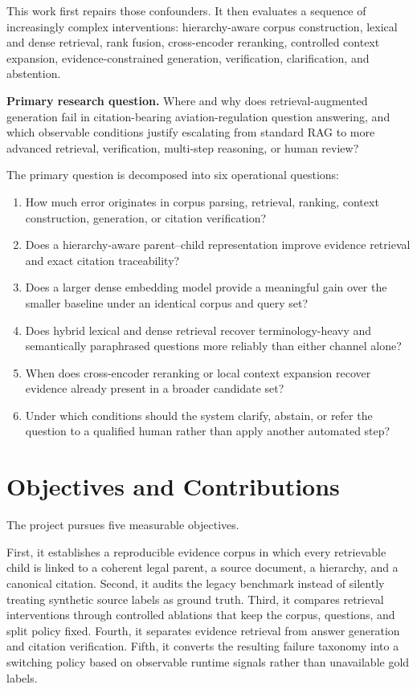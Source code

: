 This work first repairs those confounders. It then evaluates a sequence of increasingly complex interventions: hierarchy-aware corpus construction, lexical and dense retrieval, rank fusion, cross-encoder reranking, controlled context expansion, evidence-constrained generation, verification, clarification, and abstention.

\begin{infobox}
\textbf{Primary research question.}
Where and why does retrieval-augmented generation fail in citation-bearing aviation-regulation question answering, and which observable conditions justify escalating from standard RAG to more advanced retrieval, verification, multi-step reasoning, or human review?
\end{infobox}

The primary question is decomposed into six operational questions:

\begin{enumerate}
  \item How much error originates in corpus parsing, retrieval, ranking, context construction, generation, or citation verification?
  \item Does a hierarchy-aware parent--child representation improve evidence retrieval and exact citation traceability?
  \item Does a larger dense embedding model provide a meaningful gain over the smaller baseline under an identical corpus and query set?
  \item Does hybrid lexical and dense retrieval recover terminology-heavy and semantically paraphrased questions more reliably than either channel alone?
  \item When does cross-encoder reranking or local context expansion recover evidence already present in a broader candidate set?
  \item Under which conditions should the system clarify, abstain, or refer the question to a qualified human rather than apply another automated step?
\end{enumerate}

\section{Objectives and Contributions}

The project pursues five measurable objectives.

First, it establishes a reproducible evidence corpus in which every retrievable child is linked to a coherent legal parent, a source document, a hierarchy, and a canonical citation. Second, it audits the legacy benchmark instead of silently treating synthetic source labels as ground truth. Third, it compares retrieval interventions through controlled ablations that keep the corpus, questions, and split policy fixed. Fourth, it separates evidence retrieval from answer generation and citation verification. Fifth, it converts the resulting failure taxonomy into a switching policy based on observable runtime signals rather than unavailable gold labels.

